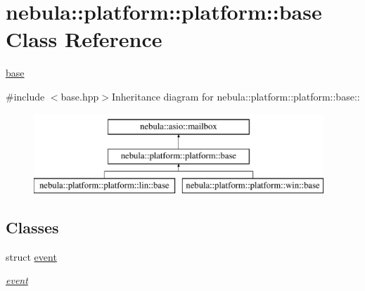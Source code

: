 \hypertarget{classnebula_1_1platform_1_1platform_1_1base}{
\section{nebula::platform::platform::base Class Reference}
\label{classnebula_1_1platform_1_1platform_1_1base}
}


\hyperlink{classnebula_1_1platform_1_1platform_1_1base}{base}  


{\ttfamily \#include $<$base.hpp$>$}Inheritance diagram for nebula::platform::platform::base::\begin{figure}[H]
\begin{center}
\leavevmode
\includegraphics[height=3cm]{classnebula_1_1platform_1_1platform_1_1base}
\end{center}
\end{figure}
\subsection*{Classes}
\begin{DoxyCompactItemize}
\item 
struct \hyperlink{structnebula_1_1platform_1_1platform_1_1base_1_1event}{event}
\begin{DoxyCompactList}\small\item\em \hyperlink{structnebula_1_1platform_1_1platform_1_1base_1_1event}{event} \item\end{DoxyCompactList}\end{DoxyCompactItemize}

